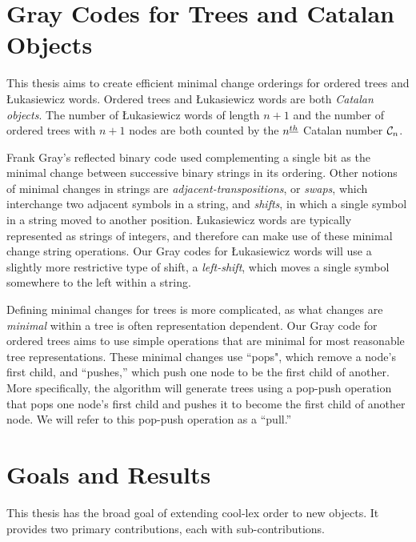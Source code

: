 \section{Gray Codes for Trees and Catalan Objects} \label{sec:intro_Graycodes}

This thesis aims to create efficient minimal change orderings for ordered trees and Łukasiewicz words.  Ordered trees and Łukasiewicz words are both \emph{Catalan objects}.  The number of Łukasiewicz words of length $n+1$ and the number of ordered trees with $n+1$ nodes are both counted by the $n^{\underline{th}}$ Catalan number $\mathcal{C}_n$.  

Frank Gray's reflected binary code used complementing a single bit as the minimal change between successive binary strings in its ordering.  Other notions of minimal changes in strings are \emph{adjacent-transpositions}, or \emph{swaps}, which interchange two adjacent symbols in a string, and \emph{shifts}, in which a single symbol in a string moved to another position. Łukasiewicz words are typically represented as strings of integers, and therefore can make use of these minimal change string operations.  Our Gray codes for Łukasiewicz words will use a slightly more restrictive type of shift, a \emph{left-shift}, which moves a single symbol somewhere to the left within a string. 




Defining minimal changes for trees is more complicated, as what changes are \emph{minimal} within a tree is often representation dependent.  Our Gray code for ordered trees aims to use simple operations that are minimal for most reasonable tree representations.  These minimal changes use ``pops", which remove a node's first child, and ``pushes,'' which push one node to be the first child of another.  More specifically, the algorithm will generate trees using a pop-push operation that pops one node's first child and pushes it to become the first child of another node.  We will refer to this pop-push operation as a ``pull.''




\section{Goals and Results}


This thesis has the broad goal of extending cool-lex order to new objects.  It provides two primary contributions, each with sub-contributions.  

